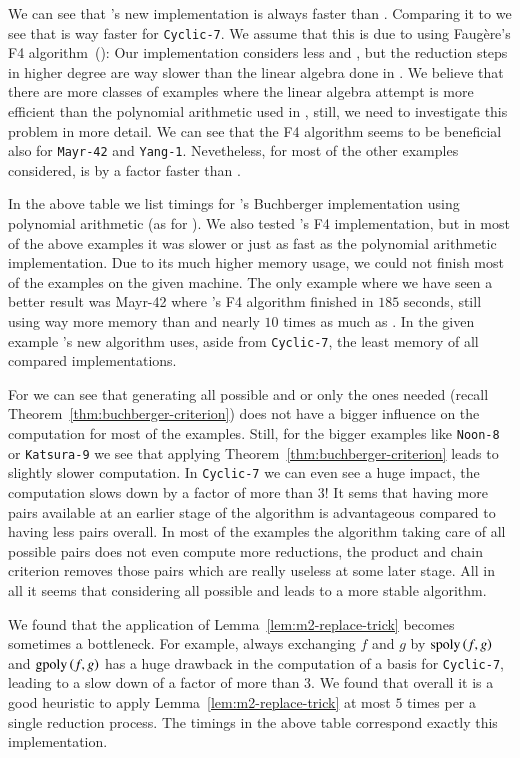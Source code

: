 We can see that \singular's new implementation is always faster than \macaulay.
Comparing it to \magma we see that \magma is way faster for \texttt{Cyclic-7}.
We assume that this is due to \magma using Faug\`ere's F4
algorithm~(\cite{fF41999}): Our implementation considers less \spts and \gpts, but
the reduction steps in higher degree are way slower than the linear algebra done
in \magma. We believe that there are more classes of examples where the linear
algebra attempt is more efficient than the polynomial arithmetic used in
\singular, still, we need to investigate this problem in more detail. We can see
that the F4 algorithm seems to be beneficial also for \texttt{Mayr-42} and \texttt{Yang-1}.
Nevetheless, for most of the other examples considered, \singular is by a
factor faster than \magma.

In the above table we list timings for \macaulay's Buchberger implementation
using polynomial arithmetic (as for \singular).
We also tested \macaulay's F4 implementation, but in most of the above examples
it was slower or just as fast as the polynomial arithmetic implementation. Due
to its much higher memory usage, we could not finish most of the examples on the
given machine. The only example where we have seen a better result was Mayr-42
where \macaulay's F4 algorithm finished in $185$ seconds, still using way more
memory than \magma and nearly $10$ times as much as \singular. In the given
example \singular's new algorithm uses, aside from \texttt{Cyclic-7}, the least memory
of all compared implementations.

For \singular we can see that generating all possible \spts and \gpts or only
the ones needed (recall Theorem~\ref{thm:buchberger-criterion}) does not have a
bigger influence on the computation for most of the examples.
Still, for the bigger examples like \texttt{Noon-8} or \texttt{Katsura-9} we see that applying
Theorem~\ref{thm:buchberger-criterion} leads to slightly slower computation. In
\texttt{Cyclic-7} we can even see a huge impact, the computation slows down by a factor
of more than $3$! It sems that having more pairs available at an earlier stage
of the algorithm is advantageous compared to having less pairs overall. In most
of the examples the algorithm taking care of all possible pairs does not even
compute more reductions, the product and chain criterion removes those
pairs which are really useless at some later stage. All in all it seems that
considering all possible \spts and \gpts leads to a more stable algorithm.

We found that the application of Lemma~\ref{lem:m2-replace-trick} becomes
sometimes a bottleneck. For example, always exchanging $f$ and $g$ by $\mathrm{spoly}\left({f},{g}\right)$ and $\mathrm{gpoly}\left({f},{g}\right)$ has a huge drawback in the computation of a basis for
\texttt{Cyclic-7}, leading to a slow down of a factor of more than $3$. We found
that overall it is a good heuristic to apply Lemma~\ref{lem:m2-replace-trick} at
most $5$ times per a single reduction process. The \singular timings in the
above table correspond exactly this implementation.
